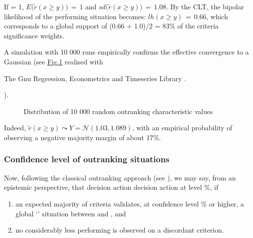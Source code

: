 \documentclass[a4paper,10pt,english]{sphinxhowto}
\let\sphinxpxdimen\pdfpxdimen\else\newdimen\sphinxpxdimen
\begin{document}
If  = 1, \(E\big(\tilde{r}(x \geq y)\big)\, = \, 1\) and \(sd\big(\tilde{r}(x \geq y)\big)\,=\, 1.08\). By the CLT, the bipolar likelihood of the  performing situation becomes: \(lh(x \geq y)\,=\, 0.66\), which corresponds to a global support of (0.66 + 1.0)/2 = 83\% of the criteria significance weights.

A  simulation with 10 000 runs empirically confirms the effective convergence to a Gaussian (see \hyperref[\detokenize{tutorial:simullikelihood}]{Fig.\@ \ref{\detokenize{tutorial:simullikelihood}}} realised with  %
\begin{footnote}[12]\sphinxAtStartFootnote
The Gnu Regression, Econometrics and Time\sphinxhyphen{}series Library  .
%
\end{footnote} ).

\begin{figure}[htbp]
\centering
\capstart

\noindent\sphinxincludegraphics[width=550\sphinxpxdimen]{{simulLikelihood}.png}
\caption{Distribution of 10 000 random outranking characteristic values}\label{\detokenize{tutorial:simullikelihood}}\end{figure}

Indeed, \(\tilde{r}(x \geq y) \leadsto Y = \mathcal{N}(1.03,1.089)\), with an empirical probability of observing a negative majority margin of about 17\%.


\subsubsection{Confidence level of outranking situations}
\label{\detokenize{tutorial:confidence-level-of-outranking-situations}}
Now, following the classical outranking approach (see  ), we may say, from an epistemic perspective, that decision action   decision action  at  level  \%, if
\begin{enumerate}
%
\item {} 
an expected majority of criteria validates, at confidence level  \% or higher, a global ‘’ situation between  and , and

\item {} 
no considerably less performing is observed on a discordant criterion.

\end{enumerate}
\end{document}
